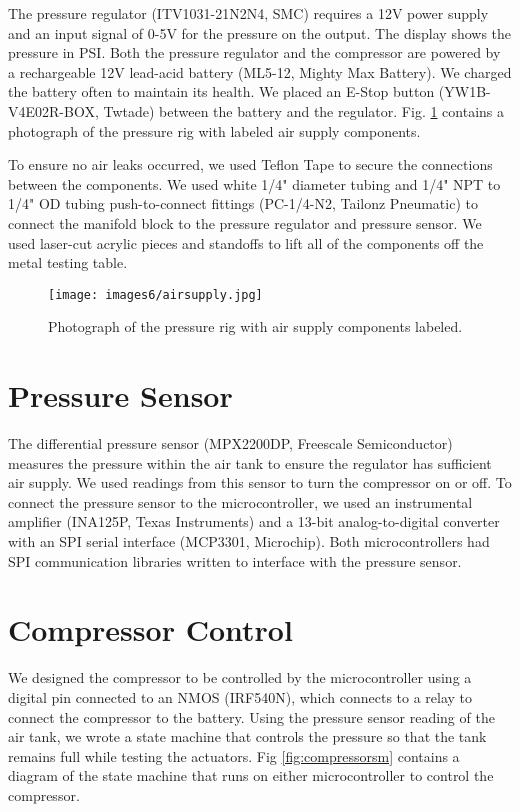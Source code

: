 The pressure regulator (ITV1031-21N2N4, SMC) requires a 12V power supply and an input signal of 0-5V for the pressure on the output. The display shows the pressure in PSI. Both the pressure regulator and the compressor are powered by a rechargeable 12V lead-acid battery (ML5-12, Mighty Max Battery). We charged the battery often to maintain its health. We placed an E-Stop button (YW1B-V4E02R-BOX, Twtade) between the battery and the regulator. Fig. \ref{fig:airsupply} contains a photograph of the pressure rig with labeled air supply components. 

To ensure no air leaks occurred, we used Teflon Tape to secure the connections between the components. We used white 1/4" diameter tubing and 1/4" NPT to 1/4" OD tubing push-to-connect fittings (PC-1/4-N2, Tailonz Pneumatic) to connect the manifold block to the pressure regulator and pressure sensor. We used laser-cut acrylic pieces and standoffs to lift all of the components off the metal testing table. 

\begin{figure}[ht]
    \centering
    \texttt{[image: images6/airsupply.jpg]}
    \caption{Photograph of the pressure rig with air supply components labeled.}
    \label{fig:airsupply}
\end{figure}

\section{Pressure Sensor}

The differential pressure sensor (MPX2200DP, Freescale Semiconductor) measures the pressure within the air tank to ensure the regulator has sufficient air supply. We used readings from this sensor to turn the compressor on or off. To connect the pressure sensor to the microcontroller, we used an instrumental amplifier (INA125P, Texas Instruments) and a 13-bit analog-to-digital converter with an SPI serial interface (MCP3301, Microchip). Both microcontrollers had SPI communication libraries written to interface with the pressure sensor. 

\section{Compressor Control}

We designed the compressor to be controlled by the microcontroller using a digital pin connected to an NMOS (IRF540N), which connects to a relay to connect the compressor to the battery. Using the pressure sensor reading of the air tank, we wrote a state machine that controls the pressure so that the tank remains full while testing the actuators. Fig \ref{fig:compressorsm} contains a diagram of the state machine that runs on either microcontroller to control the compressor. 

